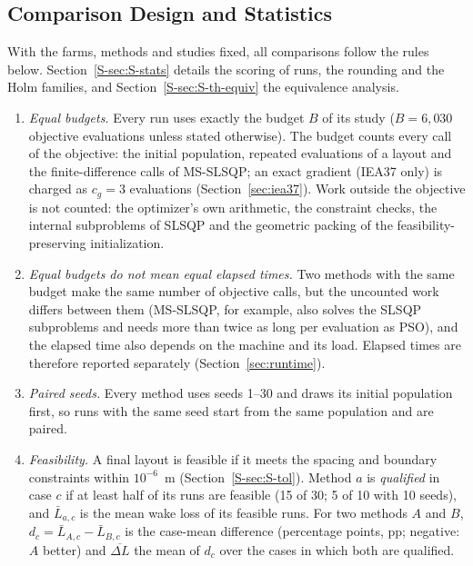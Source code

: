 \subsection{Comparison Design and Statistics}
\label{sec:setup-stats}
With the farms, methods and studies fixed, all comparisons follow the rules below. Section~\ref{S-sec:S-stats} details the scoring of runs, the rounding and the Holm families, and Section~\ref{S-sec:S-th-equiv} the equivalence analysis.
\begin{enumerate}
\item \emph{Equal budgets.} Every run uses exactly the budget $B$ of its study ($B=6{,}030$ objective evaluations unless stated otherwise). The budget counts every call of the objective: the initial population, repeated evaluations of a layout and the finite-difference calls of MS-SLSQP; an exact gradient (IEA37 only) is charged as $c_g=3$ evaluations (Section~\ref{sec:iea37}). Work outside the objective is not counted: the optimizer's own arithmetic, the constraint checks, the internal subproblems of SLSQP and the geometric packing of the feasibility-preserving initialization.
\item \emph{Equal budgets do not mean equal elapsed times.} Two methods with the same budget make the same number of objective calls, but the uncounted work differs between them (MS-SLSQP, for example, also solves the SLSQP subproblems and needs more than twice as long per evaluation as PSO), and the elapsed time also depends on the machine and its load. Elapsed times are therefore reported separately (Section~\ref{sec:runtime}).
\item \emph{Paired seeds.} Every method uses seeds 1--30 and draws its initial population first, so runs with the same seed start from the same population and are paired.
\item \emph{Feasibility.} A final layout is feasible if it meets the spacing and boundary constraints within $10^{-6}$~m (Section~\ref{S-sec:S-tol}). Method $a$ is \emph{qualified} in case $c$ if at least half of its runs are feasible (15 of 30; 5 of 10 with 10 seeds), and $\bar L_{a,c}$ is the mean wake loss of its feasible runs. For two methods $A$ and $B$, $d_c=\bar L_{A,c}-\bar L_{B,c}$ is the case-mean difference (percentage points, pp; negative: $A$ better) and $\overline{\Delta L}$ the mean of $d_c$ over the cases in which both are qualified.

\end{enumerate}
